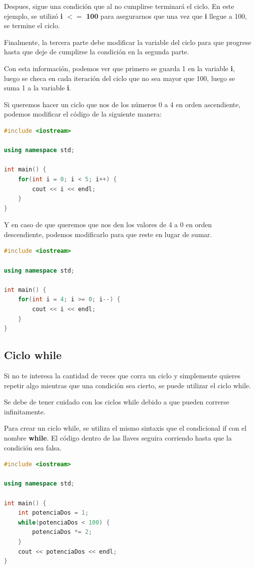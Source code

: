 \documentclass{article}
\begin{document}
Despues, sigue una condición que al no cumplirse terminará el ciclo. En este ejemplo, se utilizó \textbf{i $<=$ 100} para asegurarnos que una vez que \textbf{i} llegue a 100, se termine el ciclo.

Finalmente, la tercera parte debe modificar la variable del ciclo para que progrese hasta que deje de cumplirse la condición en la segunda parte.

Con esta información, podemos ver que primero se guarda 1 en la variable \textbf{i}, luego se checa en cada iteración del ciclo que no sea mayor que 100, luego se suma 1 a la variable \textbf{i}.

Si queremos hacer un ciclo que nos de los números 0 a 4 en orden ascendiente, podemos modificar el código de la siguiente manera:

\begin{lstlisting}[language=C++, caption=Ciclo for]
#include <iostream>

using namespace std;

int main() {
    for(int i = 0; i < 5; i++) {
        cout << i << endl;
    }
}
\end{lstlisting}

Y en caso de que queremos que nos den los valores de 4 a 0 en orden descendiente, podemos modificarlo para que reste en lugar de sumar.

\begin{lstlisting}[language=C++, caption=Ciclo for]
#include <iostream>

using namespace std;

int main() {
    for(int i = 4; i >= 0; i--) {
        cout << i << endl;
    }
}
\end{lstlisting}

\subsection{Ciclo while}

Si no te interesa la cantidad de veces que corra un ciclo y simplemente quieres repetir algo mientras que una condición sea cierto, se puede utilizar el ciclo while.

Se debe de tener cuidado con los ciclos while debido a que pueden correrse infinitamente.

Para crear un ciclo while, se utiliza el mismo sintaxis que el condicional if con el nombre \textbf{while}. El código dentro de las llaves seguira corriendo hasta que la condición sea falsa.

\begin{lstlisting}[language=C++, caption=Ciclo while]
#include <iostream>

using namespace std;

int main() {
    int potenciaDos = 1;
    while(potenciaDos < 100) {
        potenciaDos *= 2;
    }
    cout << potenciaDos << endl;
}
\end{lstlisting}
\end{document}
